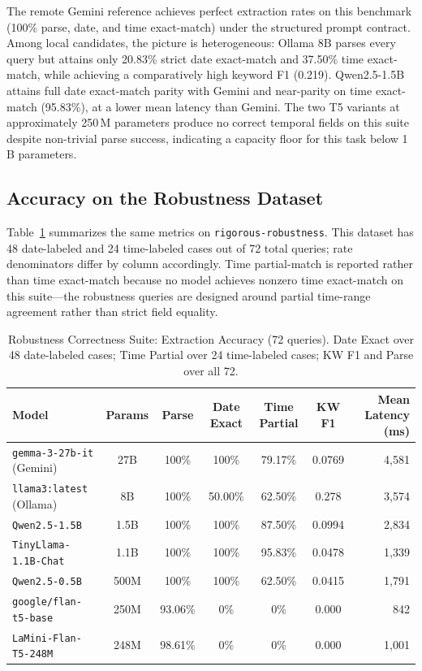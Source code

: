 \documentclass[conference]{IEEEtran}
\begin{document}
The remote Gemini reference achieves perfect extraction rates on this benchmark (100\% parse, date, and time exact-match) under the structured prompt contract. Among local candidates, the picture is heterogeneous: Ollama 8B parses every query but attains only 20.83\% strict date exact-match and 37.50\% time exact-match, while achieving a comparatively high keyword F1 (0.219). Qwen2.5-1.5B attains full date exact-match parity with Gemini and near-parity on time exact-match (95.83\%), at a lower mean latency than Gemini. The two T5 variants at approximately 250\,M parameters produce no correct temporal fields on this suite despite non-trivial parse success, indicating a capacity floor for this task below 1\,B parameters.

\subsection{Accuracy on the Robustness Dataset}

Table~\ref{table:robustness_accuracy} summarizes the same metrics on \texttt{rigorous-robustness}. This dataset has 48 date-labeled and 24 time-labeled cases out of 72 total queries; rate denominators differ by column accordingly. Time partial-match is reported rather than time exact-match because no model achieves nonzero time exact-match on this suite---the robustness queries are designed around partial time-range agreement rather than strict field equality.

\begin{table}[t]
    \centering
    \caption{Robustness Correctness Suite: Extraction Accuracy (72 queries). Date Exact over 48 date-labeled cases; Time Partial over 24 time-labeled cases; KW F1 and Parse over all 72.}
    \begin{tabular}{lcccccr}
        \toprule
        \textbf{Model} & \textbf{Params} & \textbf{Parse} & \textbf{Date Exact} & \textbf{Time Partial} & \textbf{KW F1} & \textbf{Mean Latency (ms)} \\
        \midrule
        \texttt{gemma-3-27b-it} (Gemini)    & 27B   & 100\%   & 100\%   & 79.17\% & 0.0769 & 4{,}581 \\
        \texttt{llama3:latest} (Ollama)     & 8B    & 100\%   & 50.00\% & 62.50\% & 0.278  & 3{,}574 \\
        \texttt{Qwen2.5-1.5B}               & 1.5B  & 100\%   & 100\%   & 87.50\% & 0.0994 & 2{,}834 \\
        \texttt{TinyLlama-1.1B-Chat}        & 1.1B  & 100\%   & 100\%   & 95.83\% & 0.0478 & 1{,}339 \\
        \texttt{Qwen2.5-0.5B}               & 500M  & 100\%   & 100\%   & 62.50\% & 0.0415 & 1{,}791 \\
        \texttt{google/flan-t5-base}        & 250M  & 93.06\% & 0\%     & 0\%     & 0.000  & 842     \\
        \texttt{LaMini-Flan-T5-248M}        & 248M  & 98.61\% & 0\%     & 0\%     & 0.000  & 1{,}001 \\
        \bottomrule
    \end{tabular}
    \label{table:robustness_accuracy}
\end{table}
\end{document}
